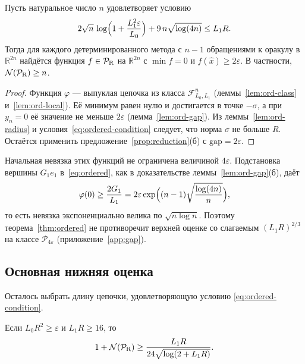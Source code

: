\documentclass[11pt,a4paper]{article}
\newcommand{\R}{\mathbb R}
\newcommand{\F}{\mathcal F}
\begin{document}
\begin{theorem}\label{thm:ordered}
Пусть натуральное число $n$ удовлетворяет условию
\begin{equation}\label{eq:ordered-condition}
 2\sqrt n\,\log\Bigl(1+\frac{L_1^2\varepsilon}{L_0}\Bigr)+9\,n\sqrt{\log(4n)}\le L_1R .
\end{equation}
Тогда для каждого детерминированного метода с $n-1$ обращениями к оракулу в $\R^{2n}$ найдётся функция $f\in\mathcal P_{\rm R}$ на $\R^{2n}$ с $\min f=0$ и $f(\hat x)\ge2\varepsilon$. В частности, $\mathcal N(\mathcal P_{\rm R})\ge n$.
\end{theorem}

\begin{proof}
Функция $\varphi$ --- выпуклая цепочка из класса $\F_{L_0,L_1}^n$ (леммы~\ref{lem:ord-class} и~\ref{lem:ord-local}). Её минимум равен нулю и достигается в точке $-\sigma$, а при $y_n=0$ её значение не меньше $2\varepsilon$ (лемма~\ref{lem:ord-gap}). Из леммы~\ref{lem:ord-radius} и условия~\eqref{eq:ordered-condition} следует, что норма $\sigma$ не больше $R$. Остаётся применить предложение~\ref{prop:reduction}(б) с $\mathrm{gap}=2\varepsilon$.
\end{proof}

Начальная невязка этих функций не ограничена величиной $4\varepsilon$. Подстановка вершины $G_1e_1$ в~\eqref{eq:ordered}, как в доказательстве леммы~\ref{lem:ord-gap}(б), даёт
\[
 \varphi(0)\ge\frac{2G_1}{L_1}=2\varepsilon\exp\Bigl((n-1)\sqrt{\frac{\log(4n)}n}\Bigr),
\]
то есть невязка экспоненциально велика по $\sqrt{n\log n}$. Поэтому теорема~\ref{thm:ordered} не противоречит верхней оценке со слагаемым $(L_1R)^{2/3}$ на классе $\mathcal P_{4\varepsilon}$ (приложение~\ref{app:gap}).

\subsection{Основная нижняя оценка}\label{sec:lower-radius-proof}

Осталось выбрать длину цепочки, удовлетворяющую условию \eqref{eq:ordered-condition}.

\begin{lemma}\label{lem:choice}
Если $L_0R^2\ge\varepsilon$ и $L_1R\ge16$, то
\[
 1+\mathcal N(\mathcal P_{\rm R})\ge\frac{L_1R}{24\sqrt{\log(2+L_1R)}} .
\]
\end{lemma}
\end{document}

